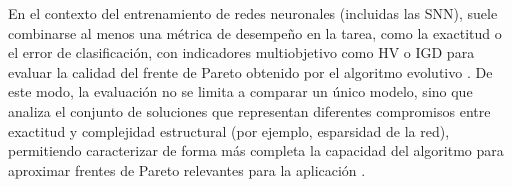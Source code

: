 En el contexto del entrenamiento de redes neuronales (incluidas las SNN), suele combinarse al menos una métrica de desempeño en la tarea, como la exactitud o el error de clasificación, con indicadores multiobjetivo como HV o IGD para evaluar la calidad del frente de Pareto obtenido por el algoritmo evolutivo \cite{Zitzler2007HV_revisited, RAVBER2017qualityindicatorsMOEA, Santos2018convergenceindicator}. De este modo, la evaluación no se limita a comparar un único modelo, sino que analiza el conjunto de soluciones que representan diferentes compromisos entre exactitud y complejidad estructural (por ejemplo, esparsidad de la red), permitiendo caracterizar de forma más completa la capacidad del algoritmo para aproximar frentes de Pareto relevantes para la aplicación \cite{RAVBER2017qualityindicatorsMOEA, Zitzler2007HV_revisited}.